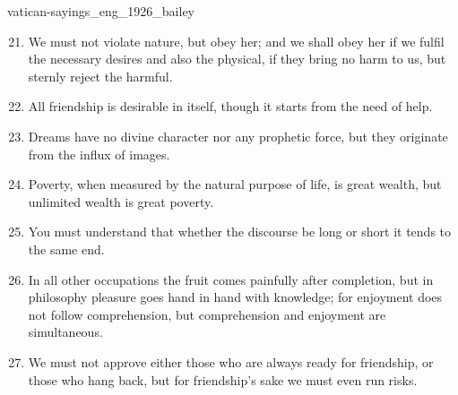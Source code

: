 \documentclass{stex}
\begin{document}
\begin{smodule}{vatican-sayings_eng_1926_bailey}
\begin{sparagraph}[id=vatican-sayings,name={Vatican Sayings}]
\begin{enumerate}[listparindent=0cm]
    \setcounter{enumi}{20}

    \item\begin{sparagraph}[id=saying:21,name=Vatican Saying 21]
      We must not violate nature, but obey her; and we shall obey her if we fulfil the necessary desires and also the physical, if they bring no harm to us, but sternly reject the harmful.
    \end{sparagraph}

    \setcounter{enumi}{22}

    \item\begin{sparagraph}[id=saying:23,name=Vatican Saying 23]
      All friendship is desirable in itself, though it starts from the need of help.
    \end{sparagraph}

    \item\begin{sparagraph}[id=saying:24,name=Vatican Saying 24]
      Dreams have no divine character nor any prophetic force, but they originate from the influx of images.
    \end{sparagraph}

    \item\begin{sparagraph}[id=saying:25,name=Vatican Saying 25]
      Poverty, when measured by the natural purpose of life, is great wealth, but unlimited wealth is great poverty.
    \end{sparagraph}

    \item\begin{sparagraph}[id=saying:26,name=Vatican Saying 26]
      You must understand that whether the discourse be long or short it tends to the same end.
    \end{sparagraph}

    \item\begin{sparagraph}[id=saying:27,name=Vatican Saying 27]
      In all other occupations the fruit comes painfully after completion, but in philosophy pleasure goes hand in hand with knowledge; for enjoyment does not follow comprehension, but comprehension and enjoyment are simultaneous.
    \end{sparagraph}

    \item\begin{sparagraph}[id=saying:28,name=Vatican Saying 28]
      We must not approve either those who are always ready for friendship, or those who hang back, but for friendship’s sake we must even run risks.
    \end{sparagraph}


\end{enumerate}
\end{sparagraph}
\end{smodule}
\end{document}
